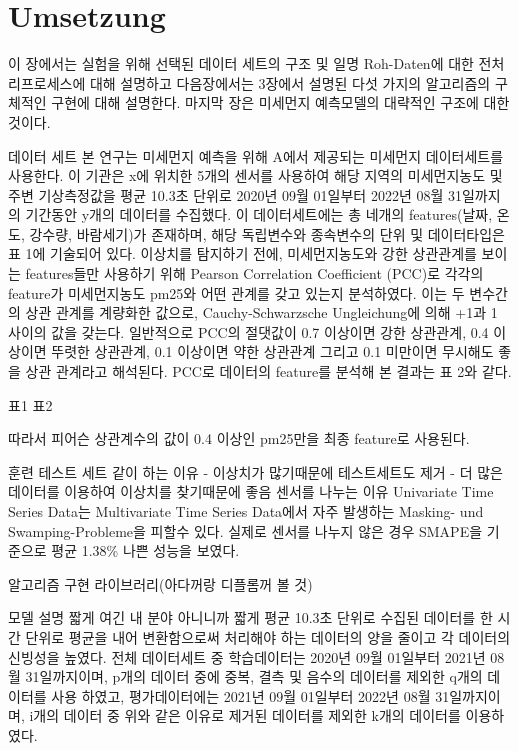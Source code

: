 \chapterpage\chapter{Umsetzung}
    이 장에서는 실험을 위해 선택된 데이터 세트의 구조 및 일명 Roh-Daten에 대한 전처리프로세스에 대해 설명하고 다음장에서는 3장에서 설명된 다섯 가지의 알고리즘의 구체적인 구현에 대해 설명한다. 마지막 장은 미세먼지 예측모델의 대략적인 구조에 대한 것이다.

    
    데이터 세트
        본 연구는 미세먼지 예측을 위해 A에서 제공되는 미세먼지 데이터세트를 사용한다. 이 기관은 x에 위치한 5개의 센서를 사용하여 해당 지역의 미세먼지농도 및 주변 기상측정값을 평균 10.3초 단위로 2020년 09월 01일부터 2022년 08월 31일까지의 기간동안 y개의 데이터를 수집했다. 이 데이터세트에는 총 네개의 features(날짜, 온도, 강수량, 바람세기)가 존재하며, 해당 독립변수와 종속변수의 단위 및 데이터타입은 표 1에 기술되어 있다. 이상치를 탐지하기 전에, 미세먼지농도와 강한 상관관계를 보이는 features들만 사용하기 위해 Pearson Correlation Coefficient (PCC)로 각각의 feature가 미세먼지농도 pm25와 어떤 관계를 갖고 있는지 분석하였다. 이는 두 변수간의 상관 관계를 계량화한 값으로, Cauchy-Schwarzsche Ungleichung에 의해 +1과 1 사이의 값을 갖는다. 일반적으로 PCC의 절댓값이 0.7 이상이면 강한 상관관계, 0.4 이상이면 뚜렷한 상관관계, 0.1 이상이면 약한 상관관계 그리고 0.1 미만이면 무시해도 좋을 상관 관계라고 해석된다. PCC로 데이터의 feature를 분석해 본 결과는 표 2와 같다.

        표1 표2
        
        따라서 피어슨 상관계수의 값이 0.4 이상인 pm25만을 최종 feature로 사용된다.

        훈련 테스트 세트 같이 하는 이유
            - 이상치가 많기때문에 테스트세트도 제거
            - 더 많은 데이터를 이용하여 이상치를 찾기때문에 좋음
        센서를 나누는 이유
            Univariate Time Series Data는 Multivariate Time Series Data에서 자주 발생하는 Masking- und Swamping-Probleme을 피할수 있다. 실제로 센서를 나누지 않은 경우 SMAPE을 기준으로 평균 1.38\% 나쁜 성능을 보였다.

    알고리즘 구현
        라이브러리(아다꺼랑 디플롬꺼 볼 것)

    모델 설명 짧게
        여긴 내 분야 아니니까 짧게
        평균 10.3초 단위로 수집된 데이터를 한 시간 단위로 평균을 내어 변환함으로써 처리해야 하는 데이터의 양을 줄이고 각 데이터의 신빙성을 높였다.
        전체 데이터세트 중 학습데이터는 2020년 09월 01일부터 2021년 08월 31일까지이며, p개의 데이터 중에 중복, 결측 및 음수의 데이터를 제외한 q개의 데이터를 사용 하였고, 평가데이터에는 2021년 09월 01일부터 2022년 08월 31일까지이며, i개의 데이터 중 위와 같은 이유로 제거된 데이터를 제외한 k개의 데이터를 이용하였다.